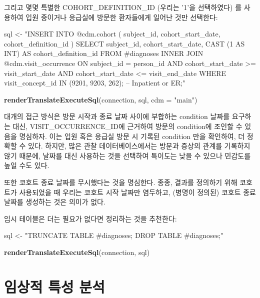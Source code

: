 \documentclass[10.5pt]{book}
\newenvironment{Shaded}{\begin{snugshade}}{\end{snugshade}}
\newcommand{\KeywordTok}[1]{\textcolor[rgb]{0.13,0.29,0.53}{\textbf{#1}}}
\newcommand{\DataTypeTok}[1]{\textcolor[rgb]{0.13,0.29,0.53}{#1}}
\newcommand{\StringTok}[1]{\textcolor[rgb]{0.31,0.60,0.02}{#1}}
\newcommand{\NormalTok}[1]{#1}
\theoremstyle{definition}
\theoremstyle{definition}
\theoremstyle{definition}
\theoremstyle{remark}
\begin{document}
그리고 몇몇 특별한 COHORT\_DEFINITION\_ID (우리는 '1'을 선택하였다) 를
사용하여 입원 중이거나 응급실에 방문한 환자들에게 일어난 것만 선택한다:

\begin{Shaded}
\begin{Highlighting}[]
\NormalTok{sql <-}\StringTok{ "INSERT INTO @cdm.cohort (}
\StringTok{  subject_id,}
\StringTok{  cohort_start_date,}
\StringTok{  cohort_definition_id}
\StringTok{  )}
\StringTok{SELECT subject_id,}
\StringTok{  cohort_start_date,}
\StringTok{  CAST (1 AS INT) AS cohort_definition_id}
\StringTok{FROM #diagnoses}
\StringTok{INNER JOIN @cdm.visit_occurrence}
\StringTok{  ON subject_id = person_id}
\StringTok{    AND cohort_start_date >= visit_start_date}
\StringTok{    AND cohort_start_date <= visit_end_date}
\StringTok{WHERE visit_concept_id IN (9201, 9203, 262); -- Inpatient or ER;"}

\KeywordTok{renderTranslateExecuteSql}\NormalTok{(connection, sql, }\DataTypeTok{cdm =} \StringTok{"main"}\NormalTok{)}
\end{Highlighting}
\end{Shaded}

대개의 접근 방식은 방문 시작과 종료 날짜 사이에 부합하는 condition
날짜를 요구하는 대신, VISIT\_OCCURRENCE\_ID에 근거하여 방문의
condition에 조인할 수 있음을 명심하자. 이는 입원 혹은 응급실 방문 시
기록된 condition 만을 확인하여, 더 정확할 수 있다. 하지만, 많은 관찰
데이터베이스에서는 방문과 증상의 관계를 기록하지 않기 때문에, 날짜를
대신 사용하는 것을 선택하여 특이도는 낮을 수 있으나 민감도를 높일 수도
있다.

또한 코호트 종료 날짜를 무시했다는 것을 명심한다. 종종, 결과를 정의하기
위해 코호트가 사용되었을 때 우리는 코호트 시작 날짜만 염두하고, (병명이
정의된) 코호트 종료 날짜를 생성하는 것은 의미가 없다.

임시 테이블은 더는 필요가 없다면 정리하는 것을 추천한다:

\begin{Shaded}
\begin{Highlighting}[]
\NormalTok{sql <-}\StringTok{ "TRUNCATE TABLE #diagnoses;}
\StringTok{DROP TABLE #diagnoses;"}

\KeywordTok{renderTranslateExecuteSql}\NormalTok{(connection, sql)}
\end{Highlighting}
\end{Shaded}

\section{임상적 특성 분석}\label{Characterizationanswers}
\end{document}
